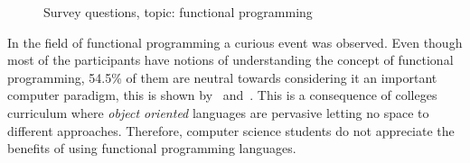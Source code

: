 \begin{figure}
  \centering
  \caption{Survey questions, topic: functional programming}
\end{figure}

In the field of functional programming a curious event was observed.
Even though most of the participants have notions of understanding the
concept of functional programming, 54.5\% of them are neutral towards
considering it an important computer paradigm, this is shown
by~ and~. This is a consequence
of colleges curriculum where \emph{object oriented} languages are
pervasive letting no space to different approaches. Therefore,
computer science students do not appreciate the benefits of using
functional programming languages.

